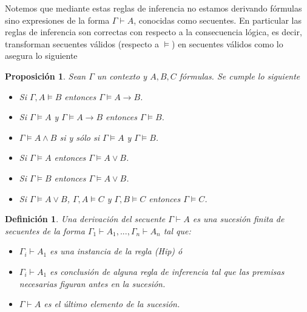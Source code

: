 \documentclass[letterpaper,12pt]{article}
\newtheorem{define}{Definición}[]
\newtheorem{prop}{Proposición}[]
\begin{document}
    Notemos que mediante estas reglas de inferencia no estamos derivando 
    fórmulas sino expresiones de la forma $\Gamma \vdash A$, conocidas como 
    secuentes. En particular las reglas de inferencia son correctas con
    respecto a la consecuencia lógica, es decir, transforman secuentes válidos
    (respecto a $\models$) en secuentes válidos como lo asegura lo siguiente

    \begin{prop}
        Sean $\Gamma$ un contexto y $A,B,C$ fórmulas. Se cumple lo siguiente
        \begin{itemize}
            \item Si $\Gamma, A \models B$ entonces 
            $\Gamma \models A \rightarrow B$.
            \item Si $\Gamma \models A$ y $\Gamma \models A \rightarrow B$
            entonces $\Gamma \models B$.
            \item $\Gamma \models A \land B$ si y sólo si $\Gamma \models A$
            y $\Gamma \models B$.
            \item Si $\Gamma \models A$ entonces $\Gamma \models A \lor B$.
            \item Si $\Gamma \models B$ entonces $\Gamma \models A \lor B$.
            \item Si $\Gamma \models A \lor B$, $\Gamma, A \models C$ y 
            $\Gamma, B \models C$ entonces $\Gamma \models C$.
        \end{itemize}
    \end{prop}

    \begin{define}
        Una derivación del secuente $\Gamma \vdash A$ es una sucesión finita
        de secuentes de la forma 
        $\Gamma_{1} \vdash A_{1},..., \Gamma_{n} \vdash A_{n}$ tal que:
        \begin{itemize}
            \item $\Gamma_{i} \vdash A_{1}$ es una instancia de la regla 
            (Hip) ó
            \item $\Gamma_{i} \vdash A_{1}$ es conclusión de alguna regla de 
            inferencia tal que las premisas necesarias figuran antes en la 
            sucesión.
            \item $\Gamma \vdash A$ es el último elemento de la sucesión.
        \end{itemize}
    \end{define}
\end{document}
